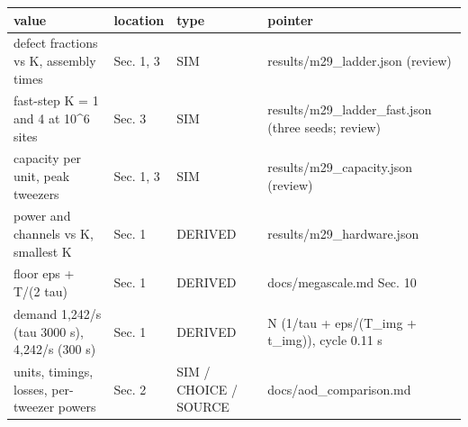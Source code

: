 {\footnotesize
\begin{longtable}[]{@{}>{\raggedright\arraybackslash}p{0.257\dimexpr(\linewidth-8\tabcolsep)\relax}>{\raggedright\arraybackslash}p{0.129\dimexpr(\linewidth-8\tabcolsep)\relax}>{\raggedright\arraybackslash}p{0.123\dimexpr(\linewidth-8\tabcolsep)\relax}>{\raggedright\arraybackslash}p{0.491\dimexpr(\linewidth-8\tabcolsep)\relax}@{}}
\toprule\noalign{}
value & location & type & pointer \\
\midrule\noalign{}
\endhead
\bottomrule\noalign{}
\endlastfoot
defect fractions vs K, assembly times & Sec. 1, 3 & SIM &
results/m29\_ladder.json (review) \\
fast-step K = 1 and 4 at 10\^{}6 sites & Sec. 3 & SIM &
results/m29\_ladder\_fast.json (three seeds; review) \\
capacity per unit, peak tweezers & Sec. 1, 3 & SIM &
results/m29\_capacity.json (review) \\
power and channels vs K, smallest K & Sec. 1 & DERIVED &
results/m29\_hardware.json \\
floor eps + T/(2 tau) & Sec. 1 & DERIVED & docs/megascale.md Sec. 10 \\
demand 1,242/s (tau 3000 s), 4,242/s (300 s) & Sec. 1 & DERIVED & N
(1/tau + eps/(T\_img + t\_img)), cycle 0.11 s \\
units, timings, losses, per-tweezer powers & Sec. 2 & SIM / CHOICE /
SOURCE & docs/aod\_comparison.md \\
\end{longtable}
}
